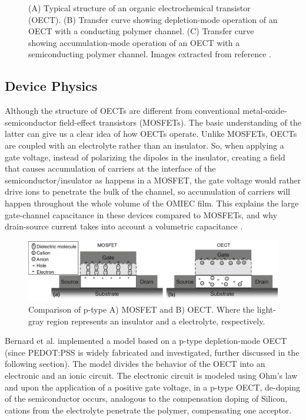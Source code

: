 \begin{figure}[ht]
	\caption{(A) Typical structure of an organic electrochemical transistor (OECT). (B) Transfer curve showing depletion-mode operation of an OECT with a conducting polymer channel. (C) Transfer curve showing accumulation-mode operation of an OECT with a semiconducting polymer channel. Images extracted from reference \cite{rivnayOrganicElectrochemicalTransistors2018}.}
	\label{fig:modes}
\end{figure}


\subsection{Device Physics}

Although the structure of OECTs are different from conventional metal-oxide-semiconductor field-effect transistors (MOSFETs). The basic understanding of the latter can give us a clear idea of how OECTs operate. Unlike MOSFETs, OECTs are coupled with an electrolyte rather than an insulator. So, when applying a gate voltage, instead of polarizing the dipoles in the insulator, creating a field that causes accumulation of carriers at the interface of the semiconductor/insulator as happens in a MOSFET, the gate voltage would rather drive ions to penetrate the bulk of the channel, so accumulation of carriers will happen throughout the whole volume of the OMIEC film. This explains the large gate-channel capacitance in these devices compared to MOSFETs, and why drain-source current takes into account a volumetric capacitance \cite{friedleinDevicePhysicsOrganic2018}.


\begin{figure}
  \centering
  \includegraphics[width=\textwidth]{Images/MOSFETvsOECTs.jpg}
  \caption{Comparison of p-type A) MOSFET and B) OECT. Where the light-gray region represents an insulator and a electrolyte, respectively.}
  \label{fig:vsMOS}
\end{figure}

Bernard et al. implemented a model based on a p-type depletion-mode OECT (since PEDOT:PSS is widely fabricated and investigated, further discussed in the following section). The model divides the behavior of the OECT into an electronic and an ionic circuit. The electronic circuit is modeled using Ohm's law and upon the application of a positive gate voltage, in a p-type OECT, de-doping of the semiconductor occurs, analogous to the compensation doping of Silicon, cations from the electrolyte penetrate the polymer, compensating one acceptor. \cite{bernardsSteadyStateTransientBehavior2007}

